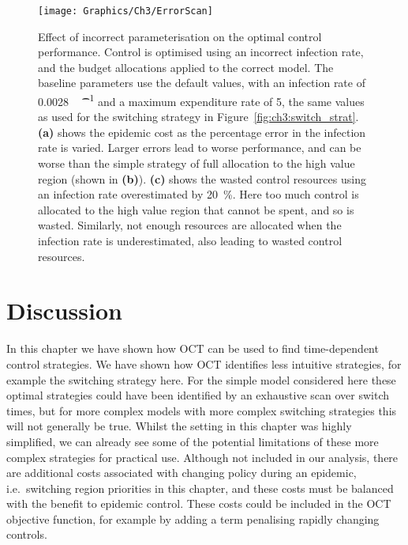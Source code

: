 \begin{figure}[H]
    \begin{center}
        \texttt{[image: Graphics/Ch3/ErrorScan]}
        \caption[Effect of incorrect parameterisation on strategy performance]{Effect of incorrect parameterisation on the optimal control performance. Control is optimised using an incorrect infection rate, and the budget allocations applied to the correct model. The baseline parameters use the default values, with an infection rate of \SI{0.0028}{\per\host\per\t} and a maximum expenditure rate of \SI{5}{\hosts}, the same values as used for the switching strategy in Figure~\ref{fig:ch3:switch_strat}. \textbf{(a)} shows the epidemic cost as the percentage error in the infection rate is varied. Larger errors lead to worse performance, and can be worse than the simple strategy of full allocation to the high value region (shown in \textbf{(b)}). \textbf{(c)} shows the wasted control resources using an infection rate overestimated by \SI{20}{\percent}. Here too much control is allocated to the high value region that cannot be spent, and so is wasted. Similarly, not enough resources are allocated when the infection rate is underestimated, also leading to wasted control resources.\label{fig:ch3:robust}}
    \end{center}
\end{figure}

\FloatBarrier
\section{Discussion}

In this chapter we have shown how OCT can be used to find time-dependent control strategies. We have shown how OCT identifies less intuitive strategies, for example the switching strategy here. For the simple model considered here these optimal strategies could have been identified by an exhaustive scan over switch times, but for more complex models with more complex switching strategies this will not generally be true. Whilst the setting in this chapter was highly simplified, we can already see some of the potential limitations of these more complex strategies for practical use. Although not included in our analysis, there are additional costs associated with changing policy during an epidemic, i.e.\ switching region priorities in this chapter, and these costs must be balanced with the benefit to epidemic control. These costs could be included in the OCT objective function, for example by adding a term penalising rapidly changing controls.

